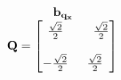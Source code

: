 \documentclass[preview]{standalone}
\begin{document}
\begin{align*}
\begin{array}{c}\begin{matrix}\hspace{1cm} \mathbf{b_{q_x}}  \quad \hspace{0.6cm} \end{matrix} \\  \mathbf{Q} = \begin{bmatrix} \frac{\sqrt{2}}{2} & \quad \frac{\sqrt{2}}{2} \\ \\-\frac{\sqrt{2}}{2} & \frac{\sqrt{2}}{2} \end{bmatrix} \end{array}
\end{align*}
\end{document}
